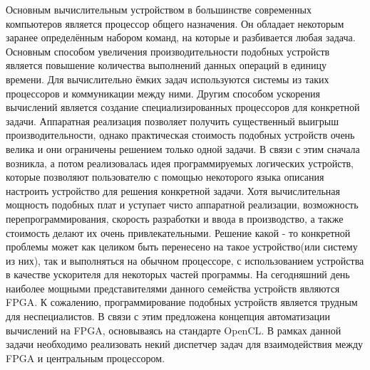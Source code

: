 Основным вычислительным устройством в большинстве современных компьютеров
является процессор общего назначения. Он обладает некоторым
заранее определённым набором команд, на которые и разбивается любая задача.
Основным способом увеличения производительности подобных устройств является
повышение количества выполнений данных операций в единицу времени. Для
вычислительно ёмких задач используются системы из таких процессоров и коммуникации между ними. 
Другим способом ускорения вычислений является создание специализированных
процессоров для конкретной задачи. Аппаратная реализация позволяет получить существенный выигрыш
производительности, однако практическая стоимость подобных устройств очень
велика и они ограничены решением только одной задачи. В связи с этим сначала
возникла, а потом реализовалась идея программируемых логических устройств,
которые позволяют пользователю с помощью некоторого языка описания настроить
устройство для решения конкретной задачи. Хотя вычислительная мощность подобных плат и уступает
чисто аппаратной реализации, возможность
перепрограммирования, скорость разработки и ввода в производство, а также
стоимость делают их очень привлекательными. Решение какой - то конкретной
проблемы может как целиком быть перенесено на такое устройство(или систему из
них), так и выполняться на обычном процессоре, с использованием устройства в
качестве ускорителя для некоторых частей программы. На сегодняшний день наиболее
мощными представителями данного семейства устройств являются FPGA. К сожалению,
программирование подобных устройств является трудным для неспециалистов. В связи
с этим предложена концепция автоматизации вычислений на FPGA, основываясь на
стандарте OpenCL. В рамках данной задачи необходимо реализовать некий диспетчер
задач для взаимодействия между FPGA и центральным процессором.
